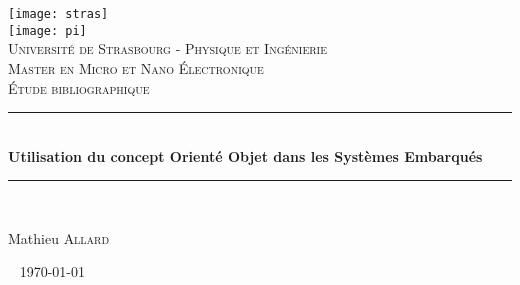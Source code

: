 \documentclass[12pt]{article} %
\begin{document}
\begin{titlepage}

\newcommand{\HRule}{\rule{\linewidth}{0.5mm}} %
\raggedright
\texttt{[image: stras]}\\[1cm] %
\raggedleft
\texttt{[image: pi]}\\[1cm] %
\center %
\textsc{\small Université de Strasbourg - Physique et Ingénierie}\\[1.5cm] %
\textsc{\small Master en Micro et Nano Électronique}\\[0.5cm] %
\textsc{\large Étude bibliographique}\\[0.5cm] %
\HRule \\[0.4cm]
{ \huge \bfseries Utilisation du concept Orienté Objet dans les Systèmes Embarqués}\\[0.4cm] %
\HRule \\[1.5cm]
\begin{minipage}{0.4\textwidth}
\begin{flushleft} \large
Mathieu \textsc{Allard} %
\end{flushleft}
\end{minipage}
~
{\large \today}\\[3cm] %
\vfill %
\end{titlepage}
\renewcommand{\contentsname}{Table des Matières}
\tableofcontents %
\newpage %
\end{document}
